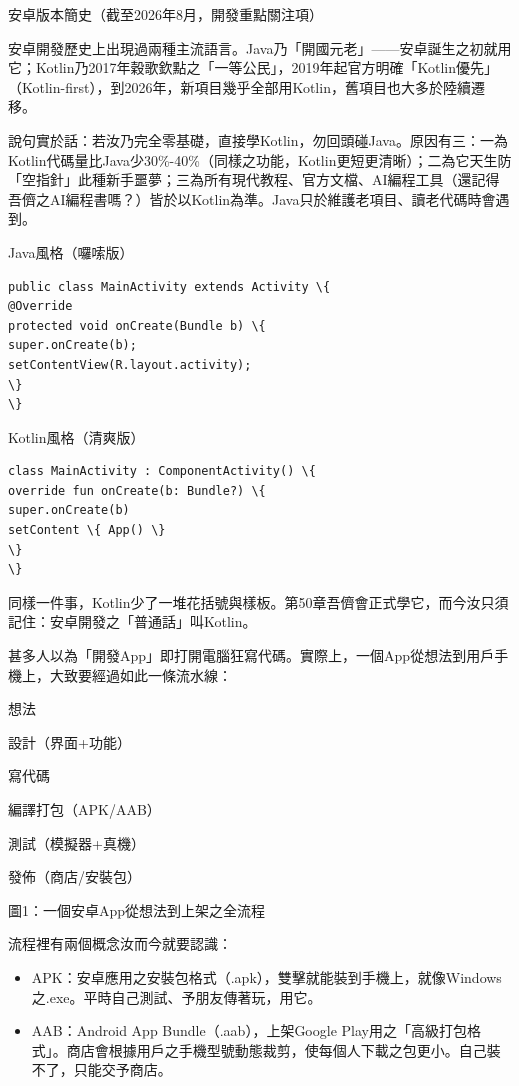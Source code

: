 \begin{center}\small\color{gray}安卓版本簡史（截至2026年8月，開發重點關注項）\end{center}


安卓開發歷史上出現過兩種主流語言。Java乃「開國元老」——安卓誕生之初就用它；Kotlin乃2017年穀歌欽點之「一等公民」，2019年起官方明確「Kotlin優先」（Kotlin-first），到2026年，新項目幾乎全部用Kotlin，舊項目也大多於陸續遷移。

說句實於話：若汝乃完全零基礎，直接學Kotlin，勿回頭碰Java。原因有三：一為Kotlin代碼量比Java少30\%-40\%（同樣之功能，Kotlin更短更清晰）；二為它天生防「空指針」此種新手噩夢；三為所有現代教程、官方文檔、AI編程工具（還記得吾儕之AI編程書嗎？）皆於以Kotlin為準。Java只於維護老項目、讀老代碼時會遇到。

Java風格（囉嗦版）

\begin{lstlisting}
public class MainActivity extends Activity \{
@Override
protected void onCreate(Bundle b) \{
super.onCreate(b);
setContentView(R.layout.activity);
\}
\}
\end{lstlisting}

Kotlin風格（清爽版）

\begin{lstlisting}
class MainActivity : ComponentActivity() \{
override fun onCreate(b: Bundle?) \{
super.onCreate(b)
setContent \{ App() \}
\}
\}
\end{lstlisting}

同樣一件事，Kotlin少了一堆花括號與樣板。第50章吾儕會正式學它，而今汝只須記住：安卓開發之「普通話」叫Kotlin。


甚多人以為「開發App」即打開電腦狂寫代碼。實際上，一個App從想法到用戶手機上，大致要經過如此一條流水線：

想法

設計（界面+功能）

寫代碼

編譯打包（APK/AAB）

測試（模擬器+真機）

發佈（商店/安裝包）

\begin{center}\small\color{gray}圖1：一個安卓App從想法到上架之全流程\end{center}

流程裡有兩個概念汝而今就要認識：

\begin{itemize}
  \item APK：安卓應用之安裝包格式（.apk），雙擊就能裝到手機上，就像Windows之.exe。平時自己測試、予朋友傳著玩，用它。
  \item AAB：Android App Bundle（.aab），上架Google Play用之「高級打包格式」。商店會根據用戶之手機型號動態裁剪，使每個人下載之包更小。自己裝不了，只能交予商店。
\end{itemize}

